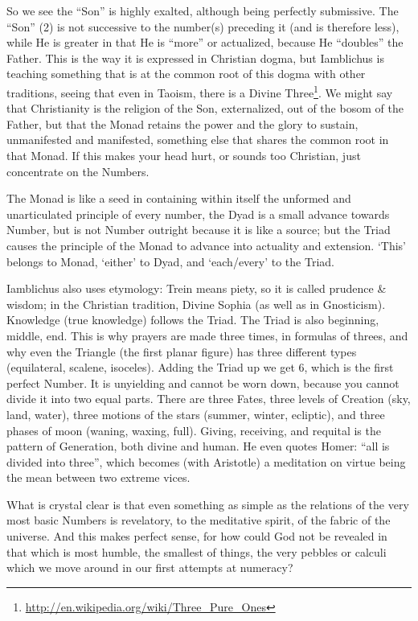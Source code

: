 So we see the ``Son'' is highly exalted, although being perfectly submissive. The ``Son'' (2) is not successive to the number(s) preceding it (and is therefore less), while He is greater in that He is ``more'' or actualized, because He ``doubles'' the Father. This is the way it is expressed in Christian dogma, but Iamblichus is teaching something that is at the common root of this dogma with other traditions, seeing that even in Taoism, there is a Divine Three\footnote{\url{http://en.wikipedia.org/wiki/Three\_Pure\_Ones}}. We might say that Christianity is the religion of the Son, externalized, out of the bosom of the Father, but that the Monad retains the power and the glory to sustain, unmanifested and manifested, something else that shares the common root in that Monad. If this makes your head hurt, or sounds too Christian, just concentrate on the Numbers.

\begin{quotex}
The Monad is like a seed in containing within itself the unformed and unarticulated principle of every number, the Dyad is a small advance towards Number, but is not Number outright because it is like a source; but the Triad causes the principle of the Monad to advance into actuality and extension. `This' belongs to Monad, `either' to Dyad, and `each/every' to the Triad.
\end{quotex}


Iamblichus also uses etymology: Trein means piety, so it is called prudence \& wisdom; in the Christian tradition, Divine Sophia (as well as in Gnosticism). Knowledge (true knowledge) follows the Triad. The Triad is also beginning, middle, end. This is why prayers are made three times, in formulas of threes, and why even the Triangle (the first planar figure) has three different types (equilateral, scalene, isoceles). Adding the Triad up we get 6, which is the first perfect Number. It is unyielding and cannot be worn down, because you cannot divide it into two equal parts. There are three Fates, three levels of Creation (sky, land, water), three motions of the stars (summer, winter, ecliptic), and three phases of moon (waning, waxing, full). Giving, receiving, and requital is the pattern of Generation, both divine and human. He even quotes Homer: ``all is divided into three'', which becomes (with Aristotle) a meditation on virtue being the mean between two extreme vices.

What is crystal clear is that even something as simple as the relations of the very most basic Numbers is revelatory, to the meditative spirit, of the fabric of the universe. And this makes perfect sense, for how could God not be revealed in that which is most humble, the smallest of things, the very pebbles or calculi which we move around in our first attempts at numeracy?



